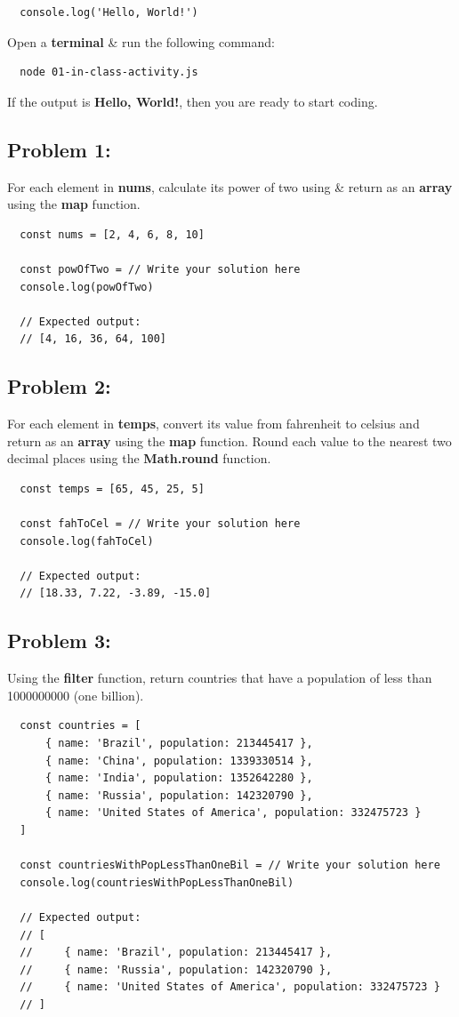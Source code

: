 \documentclass{article}
\begin{document}
\begin{verbatim}
  console.log('Hello, World!')
\end{verbatim}

Open a \textbf{terminal} \& run the following command:

\begin{verbatim}
  node 01-in-class-activity.js
\end{verbatim}

If the output is \textbf{Hello, World!}, then you are ready to start coding.

\subsection*{Problem 1:} 
For each element in \textbf{nums}, calculate its power of two using \& return as an \textbf{array} using the \textbf{map} function. 

\begin{verbatim}
  const nums = [2, 4, 6, 8, 10]

  const powOfTwo = // Write your solution here
  console.log(powOfTwo)

  // Expected output:
  // [4, 16, 36, 64, 100]
\end{verbatim}

\subsection*{Problem 2:} 
For each element in \textbf{temps}, convert its value from fahrenheit to celsius and return as an \textbf{array} using the \textbf{map} function. Round each value to the nearest two decimal places using the \textbf{Math.round} function.

\begin{verbatim}
  const temps = [65, 45, 25, 5]

  const fahToCel = // Write your solution here
  console.log(fahToCel)

  // Expected output:
  // [18.33, 7.22, -3.89, -15.0]
\end{verbatim}

\subsection*{Problem 3:} 
Using the \textbf{filter} function, return countries that have a population of less than 1000000000 (one billion).

\begin{verbatim}
  const countries = [
      { name: 'Brazil', population: 213445417 },
      { name: 'China', population: 1339330514 },
      { name: 'India', population: 1352642280 },
      { name: 'Russia', population: 142320790 },
      { name: 'United States of America', population: 332475723 }
  ]

  const countriesWithPopLessThanOneBil = // Write your solution here
  console.log(countriesWithPopLessThanOneBil)

  // Expected output:
  // [
  //     { name: 'Brazil', population: 213445417 }, 
  //     { name: 'Russia', population: 142320790 }, 
  //     { name: 'United States of America', population: 332475723 }
  // ]
\end{verbatim} 
\end{document}
